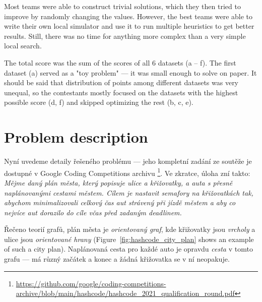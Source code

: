 
Most teams were able to construct trivial solutions, which they then tried to improve by randomly changing the values. However, the best teams were able to write their own local simulator and use it to run multiple heuristics to get better results. Still, there was no time for anything more complex than a very simple local search.


The total score was the sum of the scores of all 6 datasets (a -- f). The first dataset (a) served as a "toy problem" --- it was small enough to solve on paper. It should be said that distribution of points among different datasets was very unequal, so the contestants mostly focused on the datasets with the highest possible score (d, f) and skipped optimizing the rest (b, c, e).

\section{Problem description}

Nyní uvedeme detaily řešeného problému --- jeho kompletní zadání ze soutěže je dostupné v Google Coding Competitions archivu \footnote{\url{https://github.com/google/coding-competitions-archive/blob/main/hashcode/hashcode_2021_qualification_round.pdf}}. Ve zkratce, úloha zní takto: \textit{Mějme daný plán města, který popisuje ulice a křižovatky, a auta s přesně naplánovanými cestami městem. Cílem je nastavit semafory na křižovatkách tak, abychom minimalizovali celkový čas aut strávený při jízdě městem a aby co nejvíce aut dorazilo do cíle včas před zadaným deadlinem.}

Řečeno teorií grafů, plán města je \textit{orientovaný graf}, kde křižovatky jsou \textit{vrcholy} a ulice jsou \textit{orientované hrany} (Figure~\ref{fig:hashcode_city_plan} shows an example of such a city plan). Naplánovaná cesta pro každé auto je opravdu \textit{cesta} v tomto grafu --- má různý začátek a konec a žádná křižovatka se v ní neopakuje.

